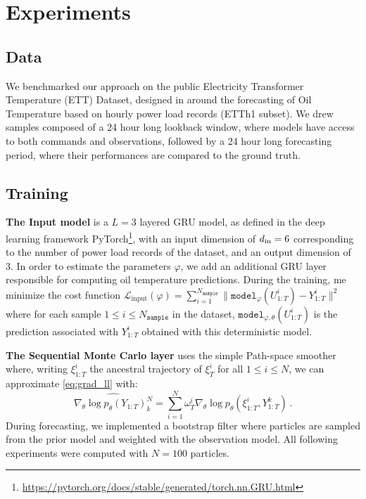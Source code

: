 \documentclass[journal]{IEEEtran}
\begin{document}
\section{Experiments}
\label{sec:exp}

\subsection{Data}
\label{sub:data}
We benchmarked our approach on the public Electricity Transformer Temperature (ETT) Dataset, designed in \cite{Zhou2021Informer} around the forecasting of Oil Temperature based on hourly power load records (ETTh1 subset).
We drew samples composed of a 24 hour long lookback window, where models have access to both commands and observations, followed by a 24 hour long forecasting period, where their performances are compared to the ground truth.

\subsection{Training}%
\label{sub:training}

\textbf{The Input model} is a $L=3$ layered GRU model, as defined in the deep learning framework PyTorch\footnote{\href{https://pytorch.org/docs/stable/generated/torch.nn.GRU.html}{https://pytorch.org/docs/stable/generated/torch.nn.GRU.html}}, with an input dimension of $d_\textnormal{in}=6$ corresponding to the number of power load records of the dataset, and an output dimension of 3.
In order to estimate the parameters $\varphi$, we add an additional GRU layer responsible for computing oil temperature predictions.
During the training, me minimize the cost function $\mathcal{L}_{\mathrm{input}}(\varphi) = \sum_{i=1}^{N_{\texttt{sample}}} \|\texttt{model}_{\varphi}(U^i_{1:T}) - Y^i_{1:T}\|^2$ where for each sample $1 \leq i \leq N_{\texttt{sample}}$ in the dataset, $\texttt{model}_{\varphi,\theta}(U^i_{1:T})$ is the prediction associated with $Y^i_{1:T}$ obtained with this deterministic model.

\textbf{The Sequential Monte Carlo layer} uses the simple Path-space smoother where, writing $\xi_{1:T}^i$ the ancestral trajectory of $\xi_T^i$ for all $1\leq i \leq N$, we can approximate \eqref{eq:grad_ll} with:
$$
	\widehat {\nabla_\theta \log p_\theta(Y_{1:T})_k^N} = \sum_{i=1}^N \omega_T^i\nabla_\theta\log p_\theta(\xi^i_{1:T}, Y^{k}_{1:T})\,.
$$
During forecasting, we implemented a bootstrap filter where particles are sampled from the prior model and weighted with the observation model.
All following experiments were computed with $N=100$ particles.
\end{document}
